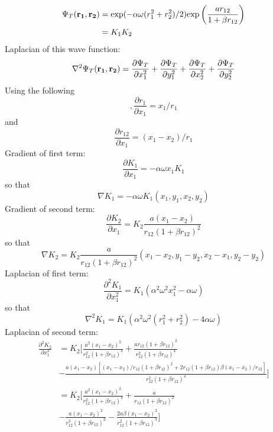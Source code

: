 \documentclass[english, a4paper]{article}
\begin{document}
\begin{align}
 \Psi_T({\bf r_1}, {\bf r_2}) &= \textrm{exp}(-\alpha \omega(r_1^2 + r_2^2)/2)
 \textrm{exp}\left(\frac{a r_{12}}{1 + \beta r_{12}}\right) \\
 &= K_1K_2
\end{align}
Laplacian of this wave function:
\begin{equation}
 \nabla^2 \Psi_T({\bf r_1}, {\bf r_2}) = \frac{\partial \Psi_T}{\partial x_1^2} + 
 \frac{\partial \Psi_T}{\partial y_1^2} + \frac{\partial \Psi_T}{\partial x_2^2} +
 \frac{\partial \Psi_T}{\partial y_2^2}
\end{equation}
Using the following
\begin{equation},
 \frac{\partial r_1}{\partial x_1} = x_1/r_1
\end{equation}
and 
\begin{equation}
 \frac{\partial r_{12}}{\partial x_1} = (x_1 - x_2)/r_1
\end{equation}
Gradient of first term:
\begin{equation}
 \frac{\partial K_1}{\partial x_1} = -\alpha \omega x_1 K_1
\end{equation}
so that
\begin{equation}
 \nabla K_1 = -\alpha \omega K_1 (x_1, y_1, x_2, y_2)
\end{equation}
Gradient of second term:
\begin{equation}
 \frac{\partial K_2}{\partial x_1} = K_2 \frac{a(x_1 - x_2)}{r_{12}(1 + \beta r_{12})^2}
\end{equation}
so that
\begin{equation}
 \nabla K_2 = K_2 \frac{a}{r_{12}(1 + \beta r_{12})^2} (x_1 - x_2, y_1 - y_2, x_2 - x_1, y_2 - y_2)
\end{equation}
Laplacian of first term:
\begin{equation}
 \frac{\partial^2 K_1}{\partial x_1^2} = K_1 (\alpha^2 \omega^2 x_1^2 -\alpha \omega )  
\end{equation}
so that
\begin{equation}
 \nabla^2 K_1 = K_1 (\alpha^2 \omega^2 (r_1^2 + r_2^2) - 4\alpha \omega)
\end{equation}
Laplacian of second term:
\begin{align}
 \frac{\partial^2 K_2}{\partial x_1^2} &= K_2 \Biggr[\frac{a^2(x_1-x_2)^2}{r_{12}^2(1 + \beta r_{12})^4} +
 \frac{ar_{12}(1 + \beta r_{12})^2}{r_{12}^2(1 + \beta r_{12})^4} \\
 &-\frac{a(x_1 - x_2)[(x_1-x_2)/r_{12} (1 + \beta r_{12})^2 + 2r_{12}(1 + \beta r_{12})\beta(x_1-x_2)/r_{12}]}
 {r_{12}^2(1 + \beta r_{12})^4} \Biggr] \\
 &= K_2 \Biggr[\frac{a^2(x_1-x_2)^2}{r_{12}^2(1 + \beta r_{12})^4} +
 \frac{a}{r_{12}(1 + \beta r_{12})^2} \\
 &-\frac{a(x_1 - x_2)^2}{r_{12}^3(1 + \beta r_{12})^2}
 - \frac{2a\beta(x_1 - x_2)^2} {r_{12}^2(1 + \beta r_{12})^3} \Biggr]
\end{align}
\end{document}
